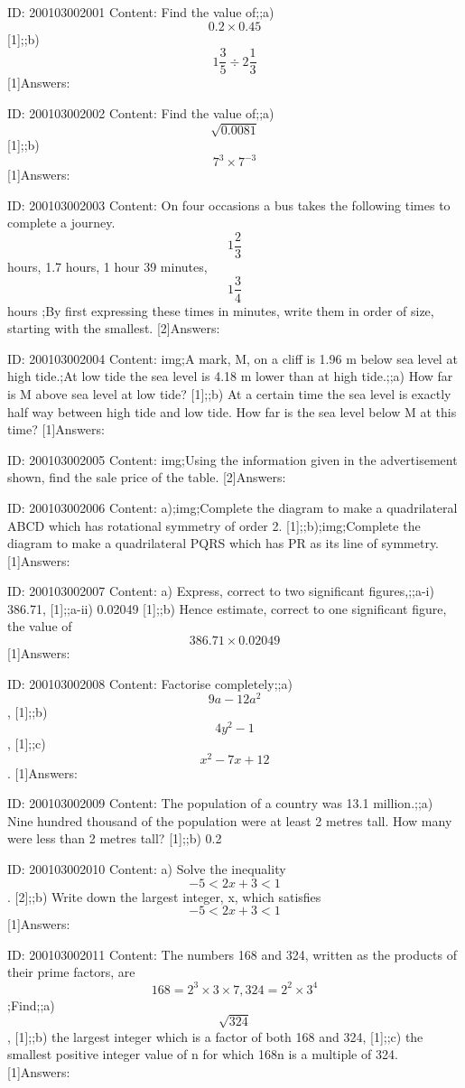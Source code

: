 \documentclass{article}
\begin{document}
ID: 200103002001
Content:
Find the value of;;a) $$0.2 \times 0.45$$ [1];;b) $$1 \frac{3}{5} \div 2 \frac{1}{3}$$ [1]Answers:

ID: 200103002002
Content:
Find the value of;;a) $$\sqrt{0.0081}$$ [1];;b) $$7^3 \times 7^{-3}$$[1]Answers:

ID: 200103002003
Content:
On four occasions a bus takes the following times to complete a journey. $$1 \frac{2}{3}$$ hours, 1.7 hours, 1 hour 39 minutes, $$1 \frac{3}{4}$$ hours ;By first expressing these times in minutes, write them in order of size, starting with the smallest. [2]Answers:

ID: 200103002004
Content:
img;A mark, M, on a cliff is 1.96 m below sea level at high tide.;At low tide the sea level is 4.18 m lower than at high tide.;;a) How far is M above sea level at low tide? [1];;b) At a certain time the sea level is exactly half way between high tide and low tide. How far is the sea level below M at this time? [1]Answers:

ID: 200103002005
Content:
img;Using the information given in the advertisement shown, find the sale price of the table. [2]Answers:

ID: 200103002006
Content:
a);img;Complete the diagram to make a quadrilateral ABCD which has rotational symmetry of order 2. [1];;b);img;Complete the diagram to make a quadrilateral PQRS which has PR as its line of symmetry. [1]Answers:

ID: 200103002007
Content:
a) Express, correct to two significant figures,;;a-i) 386.71, [1];;a-ii) 0.02049 [1];;b) Hence estimate, correct to one significant figure, the value of $$386.71 \times 0.02049$$ [1]Answers:

ID: 200103002008
Content:
Factorise completely;;a) $$9a - 12a^2$$,    [1];;b) $$4y^2 - 1$$,    [1];;c) $$x^2 - 7x + 12$$.    [1]Answers:

ID: 200103002009
Content:
The population of a country was 13.1 million.;;a) Nine hundred thousand of the population were at least 2 metres tall. How many were less than 2 metres tall?    [1];;b) 0.2%

ID: 200103002010
Content:
a) Solve the inequality $$-5 < 2x +3 < 1$$. [2];;b) Write down the largest integer, x, which satisfies $$-5 < 2x + 3 < 1$$ [1]Answers:

ID: 200103002011
Content:
The numbers 168 and 324, written as the products of their prime factors, are $$168 = 2^3 \times 3 \times 7, 324 = 2^2 \times 3^4$$ ;Find;;a) $$\sqrt{324}$$, [1];;b) the largest integer which is a factor of both 168 and 324, [1];;c) the smallest positive integer value of n for which 168n is a multiple of 324.    [1]Answers:
\end{document}
